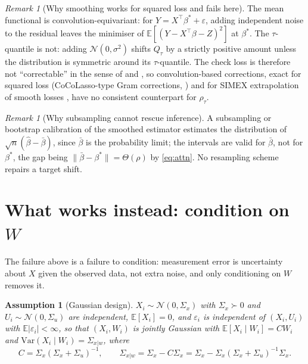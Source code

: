 \documentclass[12pt,a4paper]{article}
\newtheorem{assumption}{Assumption}[section]
\theoremstyle{definition}
\theoremstyle{remark}
\newtheorem{remark}[theorem]{Remark}
\newcommand{\E}{\mathbb{E}}
\newcommand{\cN}{\mathcal{N}}
\newcommand{\norm}[1]{\|#1\|}
\newcommand{\betah}{\hat{\beta}}
\newcommand{\betas}{\beta^*}
\newcommand{\bbar}{\bar{\beta}}
\newcommand{\Sxw}{\Sigma_{x|w}}
\newcommand{\Ccal}{C}
\begin{document}
\begin{remark}[Why smoothing works for squared loss and fails here]
The mean functional is convolution-equivariant: for $Y = X^\top\betas+\varepsilon$, adding
independent noise to the residual leaves the minimiser of $\E[(Y-X^\top\beta-Z)^2]$ at
$\betas$. The $\tau$-quantile is not: adding
$\cN(0,\sigma^2)$ shifts $Q_\tau$ by a strictly positive amount unless the distribution is
symmetric around its $\tau$-quantile. The check loss is therefore not ``correctable'' in
the sense of \citet{stefanski1989} and \citet{nakamura1990}, so
convolution-based corrections, exact for squared loss (CoCoLasso-type Gram corrections,
\citealp{datta2017cocolasso}) and for SIMEX extrapolation of smooth losses
\citep{stefanski1995simulation}, have no consistent counterpart for $\rho_\tau$.
\end{remark}

\begin{remark}[Why subsampling cannot rescue inference]
\label{rem:subsampling}
A subsampling or bootstrap calibration of the smoothed estimator
\citep{politis1999subsampling} estimates the distribution of
$\sqrt{n}(\betah-\bbar)$, since $\bbar$ is the probability limit; the intervals are valid
for $\bbar$, not for $\betas$, the gap being
$\norm{\bbar-\betas} = \Theta(\rho)$ by \eqref{eq:attn}. No resampling scheme repairs a
target shift.
\end{remark}

\section{What works instead: condition on $W$}
\label{sec:fix}

The failure above is a failure to condition: measurement error is uncertainty about $X$ given
the observed data, not extra noise, and only conditioning on $W$ removes it.

\begin{assumption}[Gaussian design]
\label{ass:gauss}
$X_i\sim\cN(0,\Sigma_x)$ with $\Sigma_x\succ0$ and $U_i\sim\cN(0,\Sigma_u)$ are independent,
$\E[X_i]=0$, and $\varepsilon_i$ is independent of $(X_i,U_i)$ with $\E|\varepsilon_i|<\infty$,
so that
$(X_i,W_i)$ is jointly Gaussian with $\E[X_i\mid W_i] = \Ccal W_i$ and
$\mathrm{Var}(X_i\mid W_i) = \Sxw$, where
\begin{equation}
\Ccal = \Sigma_x(\Sigma_x+\Sigma_u)^{-1},
\qquad
\Sxw = \Sigma_x - \Ccal\Sigma_x = \Sigma_x - \Sigma_x(\Sigma_x+\Sigma_u)^{-1}\Sigma_x .
\end{equation}
\end{assumption}
\end{document}
